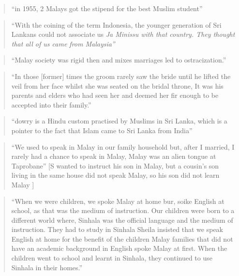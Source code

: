 \begin{quote}
    ``in 1955, 2 Malays got the stipend for the best Muslim student''\citet[55]{Saldin2003}
\end{quote}

\begin{quote}
    ``With the coining of the term Indonesia, the younger generation of Sri Lankans could not associate us \em Ja Minissu \em with that country. They thought that all of us came from Malaysia''\citet[62]{Saldin2003}
\end{quote}

\begin{quote}
    ``Malay society was rigid then and mixes marriages led to ostracization.''\citet[64]{Saldin2003}
\end{quote}

\begin{quote}
    ``In those [former] times the groom rarely saw the bride until he lifted the veil from her face whilst she was seated on the bridal throne, It was his parents and elders who had seen her and deemed her fir enough to be accepted into their family.''\citet[64]{Saldin2003}
\end{quote}

\begin{quote}
    ``dowry is a Hindu custom practised by Muslims in Sri Lanka, which is a pointer to the fact that Islam came to Sri Lanka from India''\citet[24f]{Saldin2003}
\end{quote}

\begin{quote}
    ``We used to speak in Malay in our family household but, after I married, I rarely had a chance to speak in Malay, Malay was an alien tongue at Taprobane'' [S wanted to instruct his son in Malay, but a cousin's son  living in the same house did not speak Malay, so his son did not learn Malay ]\citet[76]{Saldin2003}
\end{quote}

\begin{quote}
    ``When we were children, we spoke Malay at home bur, soike English at school, as that was the medium of instruction. Our children were born to a different world where, Sinhala was the official language  and the medium of instruction. They had to study in Sinhala \el Sheila insisted that we speak English at home for the benefit of the children \el Malay families that did not have an academic background in English spoke Malay at first. When the children went to school and learnt in Sinhala, they continued to use Sinhala in their homes.''\citet[77]{Saldin2003}
\end{quote}

